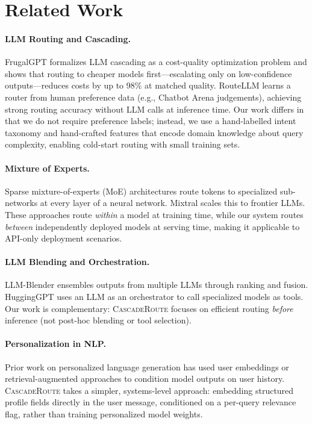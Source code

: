 \documentclass{article}
\newcommand{\system}{\textsc{CascadeRoute}}
\begin{document}
\section{Related Work}
\label{sec:related}

\paragraph{LLM Routing and Cascading.}
FrugalGPT \citep{chen2023frugalgpt} formalizes LLM cascading as a
cost-quality optimization problem and shows that routing to cheaper models
first---escalating only on low-confidence outputs---reduces costs by up to
98\% at matched quality. RouteLLM \citep{ong2024routellm} learns a router
from human preference data (e.g., Chatbot Arena judgements), achieving
strong routing accuracy without LLM calls at inference time. Our work
differs in that we do not require preference labels; instead, we use a
hand-labelled intent taxonomy and hand-crafted features that encode
domain knowledge about query complexity, enabling cold-start routing with
small training sets.

\paragraph{Mixture of Experts.}
Sparse mixture-of-experts (MoE) architectures \citep{shazeer2017moe}
route tokens to specialized sub-networks at every layer of a neural
network. Mixtral \citep{jiang2024mixtral} scales this to frontier LLMs.
These approaches route \emph{within} a model at training time, while our
system routes \emph{between} independently deployed models at serving time,
making it applicable to API-only deployment scenarios.

\paragraph{LLM Blending and Orchestration.}
LLM-Blender \citep{jiang2023llmblender} ensembles outputs from multiple
LLMs through ranking and fusion. HuggingGPT \citep{shen2023hugginggpt}
uses an LLM as an orchestrator to call specialized models as tools. Our
work is complementary: \system{} focuses on efficient routing \emph{before}
inference (not post-hoc blending or tool selection).

\paragraph{Personalization in NLP.}
Prior work on personalized language generation has used user embeddings
\citep{li2023personalized} or retrieval-augmented approaches to condition
model outputs on user history. \system{} takes a simpler, systems-level
approach: embedding structured profile fields directly in the user message,
conditioned on a per-query relevance flag, rather than training personalized
model weights.
\end{document}
